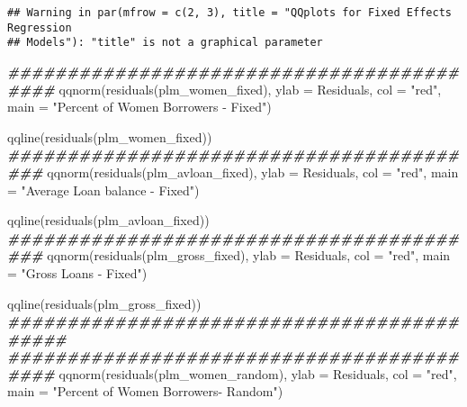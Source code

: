 \documentclass[a4paper,nobind]{templates/ociamthesis}
\newenvironment{Shaded}{\begin{snugshade}}{\end{snugshade}}
\newcommand{\AttributeTok}[1]{\textcolor[rgb]{0.77,0.63,0.00}{#1}}
\newcommand{\DocumentationTok}[1]{\textcolor[rgb]{0.56,0.35,0.01}{\textbf{\textit{#1}}}}
\newcommand{\FunctionTok}[1]{\textcolor[rgb]{0.00,0.00,0.00}{#1}}
\newcommand{\NormalTok}[1]{#1}
\newcommand{\StringTok}[1]{\textcolor[rgb]{0.31,0.60,0.02}{#1}}
\renewenvironment{Shaded}
{
  \vspace{10pt}%
  \begin{snugshade}%
}{%
  \end{snugshade}%
  \vspace{8pt}%
}
\begin{document}
\begin{landscape}
\begin{verbatim}
## Warning in par(mfrow = c(2, 3), title = "QQplots for Fixed Effects Regression
## Models"): "title" is not a graphical parameter
\end{verbatim}

\begin{Shaded}
\begin{Highlighting}[]
\DocumentationTok{\#\#\#\#\#\#\#\#\#\#\#\#\#\#\#\#\#\#\#\#\#\#\#\#\#\#\#\#\#\#\#\#\#\#\#\#\#\#\#\#\#\#}
\FunctionTok{qqnorm}\NormalTok{(}\FunctionTok{residuals}\NormalTok{(plm\_women\_fixed), }\AttributeTok{ylab =} \StringTok{\textquotesingle{}Residuals\textquotesingle{}}\NormalTok{, }\AttributeTok{col =} \StringTok{"red"}\NormalTok{, }
       \AttributeTok{main =} \StringTok{"Percent of Women Borrowers {-} Fixed"}\NormalTok{)}

\FunctionTok{qqline}\NormalTok{(}\FunctionTok{residuals}\NormalTok{(plm\_women\_fixed))}
\DocumentationTok{\#\#\#\#\#\#\#\#\#\#\#\#\#\#\#\#\#\#\#\#\#\#\#\#\#\#\#\#\#\#\#\#\#\#\#\#\#\#\#\#\#}
\FunctionTok{qqnorm}\NormalTok{(}\FunctionTok{residuals}\NormalTok{(plm\_avloan\_fixed), }\AttributeTok{ylab =} \StringTok{\textquotesingle{}Residuals\textquotesingle{}}\NormalTok{, }\AttributeTok{col =} \StringTok{"red"}\NormalTok{, }
       \AttributeTok{main =} \StringTok{"Average Loan balance {-} Fixed"}\NormalTok{)}

\FunctionTok{qqline}\NormalTok{(}\FunctionTok{residuals}\NormalTok{(plm\_avloan\_fixed))}
\DocumentationTok{\#\#\#\#\#\#\#\#\#\#\#\#\#\#\#\#\#\#\#\#\#\#\#\#\#\#\#\#\#\#\#\#\#\#\#\#\#\#\#\#\#}
\FunctionTok{qqnorm}\NormalTok{(}\FunctionTok{residuals}\NormalTok{(plm\_gross\_fixed), }\AttributeTok{ylab =} \StringTok{\textquotesingle{}Residuals\textquotesingle{}}\NormalTok{, }\AttributeTok{col =} \StringTok{"red"}\NormalTok{, }
       \AttributeTok{main =} \StringTok{"Gross Loans {-} Fixed"}\NormalTok{)}

\FunctionTok{qqline}\NormalTok{(}\FunctionTok{residuals}\NormalTok{(plm\_gross\_fixed))}
\DocumentationTok{\#\#\#\#\#\#\#\#\#\#\#\#\#\#\#\#\#\#\#\#\#\#\#\#\#\#\#\#\#\#\#\#\#\#\#\#\#\#\#\#\#\#\#}
\DocumentationTok{\#\#\#\#\#\#\#\#\#\#\#\#\#\#\#\#\#\#\#\#\#\#\#\#\#\#\#\#\#\#\#\#\#\#\#\#\#\#\#\#\#\#}
\FunctionTok{qqnorm}\NormalTok{(}\FunctionTok{residuals}\NormalTok{(plm\_women\_random), }\AttributeTok{ylab =} \StringTok{\textquotesingle{}Residuals\textquotesingle{}}\NormalTok{, }\AttributeTok{col =} \StringTok{"red"}\NormalTok{, }
       \AttributeTok{main =} \StringTok{"Percent of Women Borrowers{-} Random"}\NormalTok{)}


\end{Highlighting}
\end{Shaded}
\end{landscape}
\end{document}

